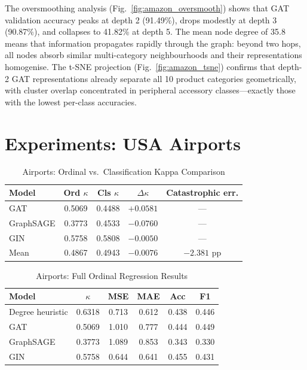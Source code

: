 \documentclass[conference]{IEEEtran}
\begin{document}
The oversmoothing analysis (Fig.~\ref{fig:amazon_oversmooth}) shows that GAT validation accuracy peaks at depth 2 (91.49\%), drops modestly at depth 3 (90.87\%), and collapses to 41.82\% at depth 5. The mean node degree of 35.8 means that information propagates rapidly through the graph: beyond two hops, all nodes absorb similar multi-category neighbourhoods and their representations homogenise. The t-SNE projection (Fig.~\ref{fig:amazon_tsne}) confirms that depth-2 GAT representations already separate all 10 product categories geometrically, with cluster overlap concentrated in peripheral accessory classes---exactly those with the lowest per-class accuracies.

\section{Experiments: USA Airports}

\begin{table}[t]
\caption{Airports: Ordinal vs.\ Classification Kappa Comparison}
\label{tab:airports_delta}
\centering
\begin{tabular}{lcccc}
\toprule
\textbf{Model} & \textbf{Ord $\kappa$} & \textbf{Cls $\kappa$} & \textbf{$\Delta\kappa$} & \textbf{Catastrophic err.} \\
\midrule
GAT        & 0.5069 & 0.4488 & $+0.0581$ & ---   \\
GraphSAGE  & 0.3773 & 0.4533 & $-0.0760$ & ---   \\
GIN        & 0.5758 & 0.5808 & $-0.0050$ & ---   \\
\midrule
Mean       & 0.4867 & 0.4943 & $-0.0076$ & $-2.381$ pp \\
\bottomrule
\end{tabular}
\end{table}

\begin{table}[t]
\caption{Airports: Full Ordinal Regression Results}
\label{tab:airports_ord}
\centering
\begin{tabular}{lccccc}
\toprule
\textbf{Model} & \textbf{$\kappa$} & \textbf{MSE} & \textbf{MAE} & \textbf{Acc} & \textbf{F1} \\
\midrule
Degree heuristic & 0.6318 & 0.713 & 0.612 & 0.438 & 0.446 \\
GAT              & 0.5069 & 1.010 & 0.777 & 0.444 & 0.449 \\
GraphSAGE        & 0.3773 & 1.089 & 0.853 & 0.343 & 0.330 \\
GIN              & 0.5758 & 0.644 & 0.641 & 0.455 & 0.431 \\
\bottomrule
\end{tabular}
\end{table}
\end{document}
